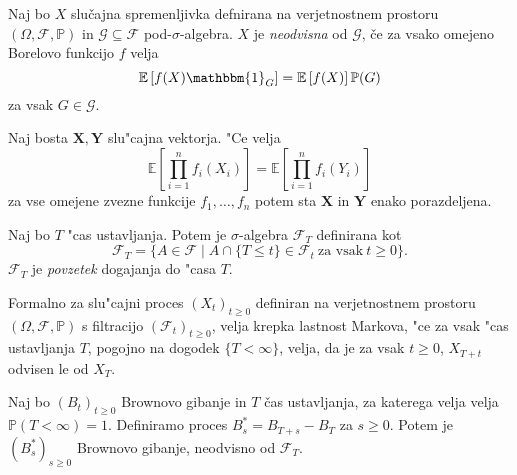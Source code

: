 \documentclass[twoside,11pt]{article}
\begin{document}
%

\begin{definicija}
    Naj bo $X$ slučajna spremenljivka defnirana na verjetnostnem prostoru $(\Omega, \mathcal{F}, \mathbb{P})$
    in $\mathcal{G} \subseteq \mathcal{F}$ pod-$\sigma$-algebra. $X$ je \textit{neodvisna}
    od $\mathcal{G}$, če za vsako omejeno Borelovo funkcijo $f$ velja
    $$
        \mathbb{E}\left[f(X)\mathbbm{1}_G\right] = \mathbb{E}\left[f(X)\right]\mathbb{P}(G)
    $$
    za vsak $G \in \mathcal{G}$.
\end{definicija}

\begin{lema}
    Naj bosta $\mathbf{X}, \mathbf{Y} $ slu"cajna vektorja. "Ce velja 
    $$
        \mathbb{E}\left[\prod_{i=1}^n f_i(X_i)\right] = \mathbb{E}\left[\prod_{i=1}^n f_i(Y_i)\right]
    $$
    za vse omejene zvezne funkcije $f_1, \ldots, f_n$ potem sta $\mathbf{X}$ in $\mathbf{Y}$ enako porazdeljena.
    \label{lema:4}
\end{lema}

\begin{definicija}
    Naj bo $T$ "cas ustavljanja. Potem  je $\sigma$-algebra $\mathcal{F}_T$ definirana kot
    $$
        \mathcal{F}_T = \{A \in \mathcal{F} \mid A \cap \{T \leq t\} \in \mathcal{F}_t \ \text{za vsak} \ t\geq 0\}.
    $$
    $\mathcal{F}_T$ je \textit{povzetek} dogajanja do "casa $T$.
\end{definicija}

Formalno za slu"cajni proces $(X_t)_{t\geq0}$ definiran na verjetnostnem prostoru $(\Omega, \mathcal{F}, \mathbb{P})$ s filtracijo $(\mathcal{F}_t)_{t\geq0}$, velja
krepka lastnost Markova, "ce za vsak "cas ustavljanja $T$, pogojno na dogodek $\{T < \infty\}$, velja, da je za vsak $t \geq 0$,  $X_{T + t}$ odvisen le od $X_T$.

\begin{izrek}
    Naj bo $(B_t)_{t\geq 0}$ Brownovo gibanje in $T$ čas ustavljanja, za katerega velja velja $\mathbb{P}(T<\infty )=1$.
    Definiramo proces $B^*_s = B_{T + s} - B_T$ za $s\geq0$. Potem je $(B^*_s)_{s\geq0}$ Brownovo
    gibanje, neodvisno od $\mathcal{F}_T$.
\end{izrek}
\end{document}
